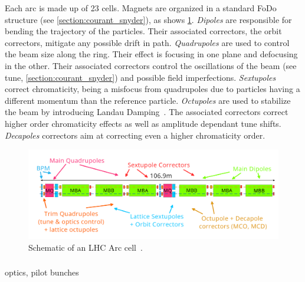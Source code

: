 Each arc is made up of 23 cells. Magnets are organized in a standard FoDo structure
(see \ref{section:courant_snyder}), as shows \cref{fig:introduction:lhc_arc_cell}.
\textit{Dipoles} are responsible for bending the trajectory of the particles. Their associated
correctors, the orbit correctors, mitigate any possible drift in path.
\textit{Quadrupoles} are used to control the beam size along the ring. Their effect is focusing in
one plane and defocusing in the other. Their associated correctors control the oscillations of the
beam (see tune, \ref{section:courant_snyder}) and possible field imperfections.
\textit{Sextupoles} correct chromaticity, being a misfocus from quadrupoles due to particles having
a different momentum than the reference particle.
\textit{Octupoles} are used to stabilize the beam by introducing Landau
Damping~\cite{gareyte_landau_1997}. The associated correctors correct higher order chromaticity
effects as well as amplitude dependant tune shifts.
\textit{Decapoles} correctors aim at correcting even a higher chromaticity order.

\begin{figure}[H]
    \centering
    \includegraphics[width=1\textwidth]{./images/lhc_cell.png}
    \caption{Schematic of an LHC Arc cell~\cite{bruning_lhc_2004}.}
    \label{fig:introduction:lhc_arc_cell}
\end{figure}



\subsubsection{}

optics, pilot bunches

